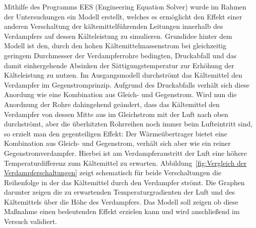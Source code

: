 Mithilfe des Programms EES (Engineering Equation Solver) wurde im Rahmen der Untersuchungen ein Modell erstellt, welches es ermöglicht den Effekt einer anderen Verschaltung der kältemittelführenden Leitungen innerhalb des Verdampfers auf dessen Kälteleistung zu simulieren. Grundidee hinter dem Modell ist den, durch den hohen Kältemittelmassenstrom bei gleichzeitig geringem Durchmesser der Verdampferrohre bedingten, Druckabfall und das damit einhergehende Absinken der Sättigungstemperatur zur Erhöhung der Kälteleistung zu nutzen. Im Ausgangsmodell durchströmt das Kältemittel den Verdampfer im Gegenstromprinzip. Aufgrund des Druckabfalls verhält sich diese Anordung wie eine Kombination aus Gleich- und Gegenstrom. Wird nun die Anordnung der Rohre dahingehend geändert, dass das Kältemittel den Verdampfer von dessen Mitte aus im Gleichstrom mit der Luft nach oben durchströmt, aber die überhitzten Rohrreihen noch immer beim Lufteintritt sind, so erzielt man den gegenteiligen Effekt: Der Wärmeübertrager bietet eine Kombination aus Gleich- und Gegenstrom, verhält sich aber wie ein reiner Gegenstromverdampfer. Hierbei ist am Verdampferaustritt der Luft eine höhere Temperaturdifferenz zum Kältemittel zu erwarten. Abbildung~\ref{fig:Vergleich der Verdampferschaltungen} zeigt schematisch für beide Verschaltungen die Reihenfolge in der das Kältemittel durch den Verdampfer strömt. Die Graphen darunter zeigen die zu erwartenden Temperaturgradienten der Luft und des Kältemittels über die Höhe des Verdampfers. \newline
Das Modell soll zeigen ob diese Maßnahme einen bedeutenden Effekt erzielen kann und wird anschließend im Versuch validiert.


